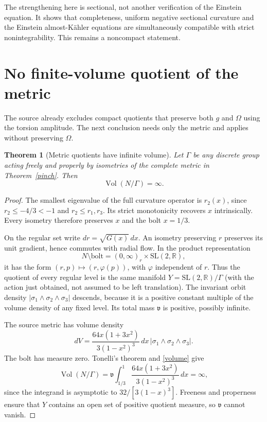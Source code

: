 \documentclass[11pt,a4paper]{article}
\newtheorem{theorem}{Theorem}[section]
\theoremstyle{definition}\newtheorem{assumption}[theorem]{Input}
\theoremstyle{remark}\newtheorem{remark}[theorem]{Remark}
\newcommand{\Vol}{\operatorname{Vol}}
\newcommand{\R}{\mathbb R}
\numberwithin{equation}{section}
\begin{document}
The strengthening here is sectional, not another verification of the Einstein equation. It shows that completeness, uniform negative sectional curvature and the Einstein almost-K\"ahler equations are simultaneously compatible with strict nonintegrability. This remains a noncompact statement.

\section{No finite-volume quotient of the metric}
The source already excludes compact quotients that preserve both $g$ and $\Omega$ using the torsion amplitude. The next conclusion needs only the metric and applies without preserving $\Omega$.

\begin{theorem}[Metric quotients have infinite volume]\label{no-quotient}
Let $\Gamma$ be any discrete group acting freely and properly by isometries of the complete metric in Theorem~\ref{pinch}. Then
\[
 \Vol(N/\Gamma)=\infty.
\]
\end{theorem}
\begin{proof}
The smallest eigenvalue of the full curvature operator is $r_2(x)$, since $r_2\le-4/3<-1$ and $r_2\le r_1,r_3$. Its strict monotonicity recovers $x$ intrinsically. Every isometry therefore preserves $x$ and the bolt $x=1/3$.

On the regular set write $dr=\sqrt{G(x)}\,dx$. An isometry preserving $r$ preserves its unit gradient, hence commutes with radial flow. In the product representation
\[
 N\setminus\mathrm{bolt}=(0,\infty)_r\times\mathrm{SL}(2,\R),
\]
it has the form $(r,p)\mapsto(r,\varphi(p))$, with $\varphi$ independent of $r$. Thus the quotient of every regular level is the same manifold $Y=\mathrm{SL}(2,\R)/\Gamma$ (with the action just obtained, not assumed to be left translation). The invariant orbit density $|\sigma_1\wedge\sigma_2\wedge\sigma_3|$ descends, because it is a positive constant multiple of the volume density of any fixed level. Its total mass $\mathfrak v$ is positive, possibly infinite.

The source metric has volume density
\begin{equation}\label{volume}
 dV=\frac{64x(1+3x^2)}{3(1-x^2)^3}\,dx\,
       |\sigma_1\wedge\sigma_2\wedge\sigma_3|.
\end{equation}
The bolt has measure zero. Tonelli's theorem and \eqref{volume} give
\[
 \Vol(N/\Gamma)=\mathfrak v\int_{1/3}^1
          \frac{64x(1+3x^2)}{3(1-x^2)^3}\,dx=\infty,
\]
since the integrand is asymptotic to $32/[3(1-x)^3]$. Freeness and properness ensure that $Y$ contains an open set of positive quotient measure, so $\mathfrak v$ cannot vanish.
\end{proof}
\end{document}
